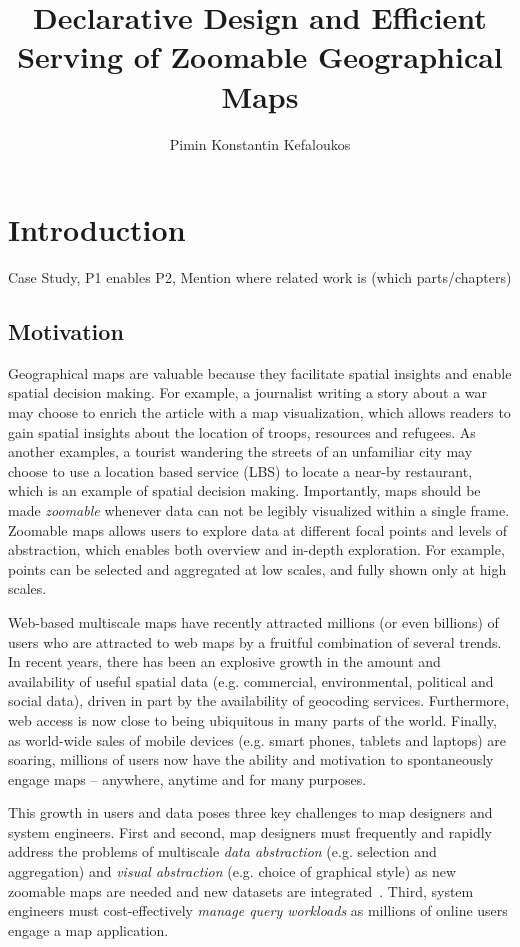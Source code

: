 \documentclass[11pt, oneside]{report}   	%
\title{Declarative Design and Efficient Serving of Zoomable Geographical Maps}
\author{Pimin Konstantin Kefaloukos}
\begin{document}
\maketitle

\tableofcontents

\chapter{Introduction}

Case Study, P1 enables P2, Mention where related work is (which parts/chapters)


\section{Motivation}
Geographical maps are valuable because they facilitate spatial insights and enable spatial decision making. For example, a journalist writing a story about a war may choose to enrich the article with a map visualization, which allows readers to gain spatial insights about the location of troops, resources and refugees. As another examples, a tourist wandering the streets of an unfamiliar city may choose to use a location based service (LBS) to locate a near-by restaurant, which is an example of spatial decision making. Importantly, maps should be made \emph{zoomable} whenever data can not be legibly visualized within a single frame. Zoomable maps allows users to explore data at different focal points and levels of abstraction, which enables both overview and in-depth exploration. For example, points can be selected and aggregated at low scales, and fully shown only at high scales.

Web-based multiscale maps have recently attracted millions (or even billions) of users who are attracted to web maps by a fruitful combination of several trends. In recent years, there has been an explosive growth in the amount and availability of useful spatial data (e.g. commercial, environmental, political and social data), driven in part by the availability of geocoding services. Furthermore, web access is now close to being ubiquitous in many parts of the world. Finally, as world-wide sales of mobile devices (e.g. smart phones, tablets and laptops) are soaring, millions of users now have the ability and motivation to spontaneously engage maps -- anywhere, anytime and for many purposes.

This growth in users and data poses three key challenges to map designers and system engineers. First and second, map designers must frequently and rapidly address the problems of multiscale \emph{data abstraction} (e.g. selection and aggregation) and \emph{visual abstraction} (e.g. choice of graphical style) as new zoomable maps are needed and new datasets are integrated~\cite{stolte2003multiscale}. Third, system engineers must cost-effectively \emph{manage query workloads} as millions of online users engage a map application.
\end{document}
